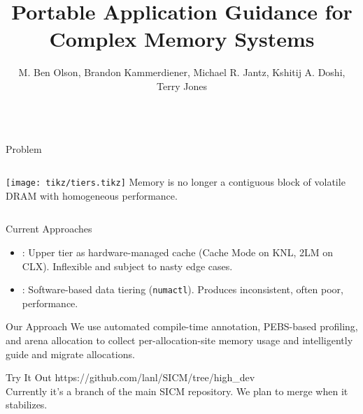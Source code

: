 \documentclass[final,hyperref={pdfpagelabels=false}]{beamer}
\title{Portable Application Guidance for Complex Memory Systems}
\author{M. Ben Olson, Brandon Kammerdiener, Michael R. Jantz, Kshitij A. Doshi, Terry Jones}
\begin{document}
\begin{frame}{}
\begin{columns}[t]
  \begin{column}{.45\linewidth}

    \begin{block}{Problem}
      \begin{columns}%
        \texttt{[image: tikz/tiers.tikz]}
        Memory is no longer a contiguous block of
        volatile DRAM with homogeneous performance.
      \end{columns}%
      \vspace{1mm}%
    \end{block}

    \begin{block}{Current Approaches}
      \begin{itemize}
				\item {}:
          Upper tier as hardware-managed cache (Cache Mode on KNL, 2LM on CLX).
          Inflexible and subject to nasty edge cases.
				\item {}:
					Software-based data tiering (\texttt{numactl}). Produces inconsistent, often poor,
          performance.
      \end{itemize}
    \end{block}

    \begin{block}{Our Approach}
      We use automated compile-time annotation, PEBS-based profiling, and arena
      allocation to collect per-allocation-site memory usage and intelligently
      guide and migrate allocations.
      \vspace{1em}
      \begin{center}
        \resizebox{0.85\textwidth}{!}{%
          
        }
      \end{center}
    \end{block}

    \begin{block}{Try It Out}
        https://github.com/lanl/SICM/tree/high\_dev
        \\\vspace{1em}
        Currently it's a branch of the main SICM repository. We plan to merge when it stabilizes.
    \end{block}


  \end{column}
  

\end{columns}
\end{frame}
\end{document}
